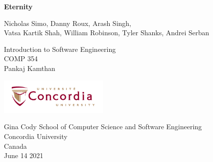 \begin{titlepage}
   \begin{center}
       \vspace*{1cm}

       \Huge
       \textbf{Eternity}

        \vspace{0.5cm}
        \Large
        Nicholas Simo, Danny Roux, Arash Singh,
        \\Vatsa Kartik Shah, William Robinson, Tyler Shanks, Andrei Serban
       
       \vspace{6cm}
        Introduction to Software Engineering
        \\COMP 354
        \\Pankaj Kamthan

        
       \vspace{1.5cm}
        
        \Large

       \vfill
            
       \vspace{0.8cm}
     
       \includegraphics[width=0.4\textwidth]{images/concologo.png}

       Gina Cody School of Computer Science and Software Engineering\\
       Concordia University\\
       Canada\\
       June 14 2021
            
   \end{center}
\end{titlepage}